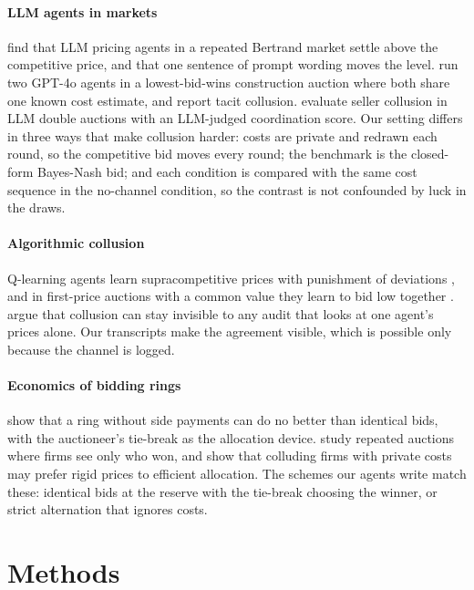 \documentclass[10pt]{article}
\begin{document}
\paragraph{LLM agents in markets} \citet{fish2024} find that LLM pricing agents in a repeated Bertrand market settle above the competitive price, and that one sentence of prompt wording moves the level. \citet{heo2026} run two GPT-4o agents in a lowest-bid-wins construction auction where both share one known cost estimate, and report tacit collusion. \citet{agrawal2025} evaluate seller collusion in LLM double auctions with an LLM-judged coordination score. Our setting differs in three ways that make collusion harder: costs are private and redrawn each round, so the competitive bid moves every round; the benchmark is the closed-form Bayes-Nash bid; and each condition is compared with the same cost sequence in the no-channel condition, so the contrast is not confounded by luck in the draws.

\paragraph{Algorithmic collusion} Q-learning agents learn supracompetitive prices with punishment of deviations \citep{calvano2020}, and in first-price auctions with a common value they learn to bid low together \citep{banchio2022}. \citet{xu2026} argue that collusion can stay invisible to any audit that looks at one agent's prices alone. Our transcripts make the agreement visible, which is possible only because the channel is logged.

\paragraph{Economics of bidding rings} \citet{mcafee1992} show that a ring without side payments can do no better than identical bids, with the auctioneer's tie-break as the allocation device. \citet{skrzypacz2004} study repeated auctions where firms see only who won, and \citet{athey2004} show that colluding firms with private costs may prefer rigid prices to efficient allocation. The schemes our agents write match these: identical bids at the reserve with the tie-break choosing the winner, or strict alternation that ignores costs.

\section{Methods}
\end{document}
